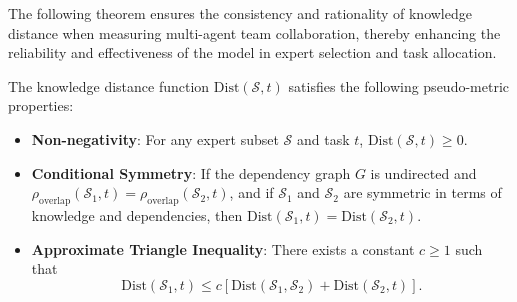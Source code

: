 The following theorem ensures the consistency and rationality of knowledge distance when measuring multi-agent team collaboration, thereby enhancing the reliability and effectiveness of the model in expert selection and task allocation.

\begin{theorem}
\label{the:Pseudo-Metric}
The knowledge distance function $\text{Dist}(\mathcal{S}, t)$ satisfies the following pseudo-metric properties:

\begin{itemize}
\setlength{\itemsep}{0pt}
\setlength{\parsep}{0pt}
\setlength{\parskip}{0pt}
\item \textbf{Non-negativity}: For any expert subset $\mathcal{S}$ and task $t$, $\text{Dist}(\mathcal{S}, t) \geq 0$.  


\item \textbf{Conditional Symmetry}: If the dependency graph $G$ is undirected and $\rho_{\text{overlap}}(\mathcal{S}_1, t) = \rho_{\text{overlap}}(\mathcal{S}_2, t)$, and if $\mathcal{S}_1$ and $\mathcal{S}_2$ are symmetric in terms of knowledge and dependencies, then $\text{Dist}(\mathcal{S}_1, t) = \text{Dist}(\mathcal{S}_2, t)$.  


\item \textbf{Approximate Triangle Inequality}: There exists a constant $c \geq 1$ such that  
\[
\text{Dist}(\mathcal{S}_1, t) \leq c\left[\text{Dist}(\mathcal{S}_1, \mathcal{S}_2) + \text{Dist}(\mathcal{S}_2, t)\right].
\]  



\end{itemize}
\end{theorem}
